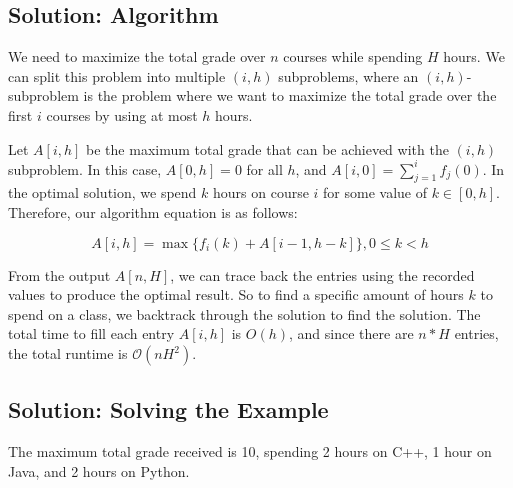 \documentclass[letter,11pt]{article}
\begin{document}
\subsection{Solution: Algorithm}

We need to maximize the total grade over $n$ courses while spending $H$ hours. We can split this problem into multiple $(i, h)$ subproblems, where an $(i,h)$-subproblem is the problem where we want to maximize the total grade over the first $i$ courses by using at most $h$ hours.

Let $A[i,h]$ be the maximum total grade that can be achieved with the $(i,h)$ subproblem. In this case, $A[0,h] = 0$ for all $h$, and $A[i,0] = \sum_{j = 1}^{i} f_j(0)$. In the optimal solution, we spend $k$ hours on course $i$ for some value of $k \in [0,h]$. Therefore, our algorithm equation is as follows:

\[A[i,h] = \max \{f_i(k) + A[i-1,h-k]\}, 0 \leq k < h\]

From the output $A[n, H]$, we can trace back the entries using the recorded values to produce the optimal result. So to find a specific amount of hours $k$ to spend on a class, we backtrack through the solution to find the solution. The total time to fill each entry $A[i,h]$ is $O(h)$, and since there are $n * H$ entries, the total runtime is $\mathcal{O}(nH^2)$.

\subsection{Solution: Solving the Example}

The maximum total grade received is 10, spending 2 hours on C++, 1 hour on Java, and 2 hours on Python.
\end{document}
